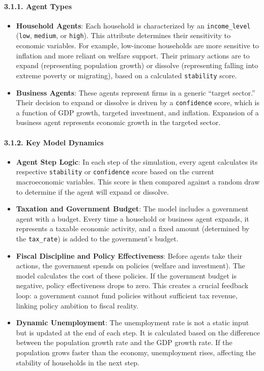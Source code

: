 \documentclass[
]{article}
\providecommand{\tightlist}{%
  \setlength{\itemsep}{0pt}\setlength{\parskip}{0pt}}
\begin{document}
\paragraph{3.1.1. Agent Types}\label{agent-types}

\begin{itemize}
\tightlist
\item
  \textbf{Household Agents}: Each household is characterized by an
  \texttt{income\_level} (\texttt{low}, \texttt{medium}, or
  \texttt{high}). This attribute determines their sensitivity to
  economic variables. For example, low-income households are more
  sensitive to inflation and more reliant on welfare support. Their
  primary actions are to expand (representing population growth) or
  dissolve (representing falling into extreme poverty or migrating),
  based on a calculated \texttt{stability} score.
\item
  \textbf{Business Agents}: These agents represent firms in a generic
  ``target sector.'' Their decision to expand or dissolve is driven by a
  \texttt{confidence} score, which is a function of GDP growth, targeted
  investment, and inflation. Expansion of a business agent represents
  economic growth in the targeted sector.
\end{itemize}

\paragraph{3.1.2. Key Model Dynamics}\label{key-model-dynamics}

\begin{itemize}
\tightlist
\item
  \textbf{Agent Step Logic}: In each step of the simulation, every agent
  calculates its respective \texttt{stability} or \texttt{confidence}
  score based on the current macroeconomic variables. This score is then
  compared against a random draw to determine if the agent will expand
  or dissolve.
\item
  \textbf{Taxation and Government Budget}: The model includes a
  government agent with a budget. Every time a household or business
  agent expands, it represents a taxable economic activity, and a fixed
  amount (determined by the \texttt{tax\_rate}) is added to the
  government's budget.
\item
  \textbf{Fiscal Discipline and Policy Effectiveness}: Before agents
  take their actions, the government spends on policies (welfare and
  investment). The model calculates the cost of these policies. If the
  government budget is negative, policy effectiveness drops to zero.
  This creates a crucial feedback loop: a government cannot fund
  policies without sufficient tax revenue, linking policy ambition to
  fiscal reality.
\item
  \textbf{Dynamic Unemployment}: The unemployment rate is not a static
  input but is updated at the end of each step. It is calculated based
  on the difference between the population growth rate and the GDP
  growth rate. If the population grows faster than the economy,
  unemployment rises, affecting the stability of households in the next
  step.
\end{itemize}
\end{document}
